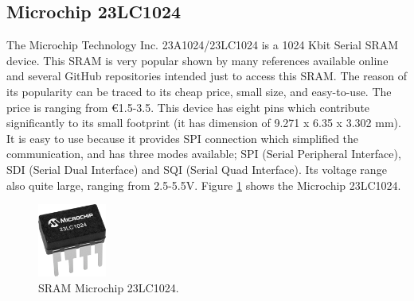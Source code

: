 \subsection{Microchip 23LC1024}
The Microchip Technology Inc. 23A1024/23LC1024 is a 1024 Kbit Serial SRAM device. This SRAM is very popular shown by many references available online and several GitHub repositories intended just to access this SRAM. The reason of its popularity can be traced to its cheap price, small size, and easy-to-use. The price is ranging from \euro{}1.5-3.5. This device has eight pins which contribute significantly to its small footprint (it has dimension of 9.271 x 6.35 x 3.302 mm).
It is easy to use because it provides SPI connection which simplified the communication, and has three modes available; SPI (Serial Peripheral Interface), SDI (Serial Dual Interface) and SQI (Serial Quad Interface). Its voltage range also quite large, ranging from 2.5-5.5V. Figure \ref{fig:23LC1024} shows the Microchip 23LC1024.

\begin{figure}[tph!]
    \centerline{\includegraphics[width={0.2\textwidth}]{images/23lc1024}}
    \caption{SRAM Microchip 23LC1024.}
    \label{fig:23LC1024}
\end{figure}

